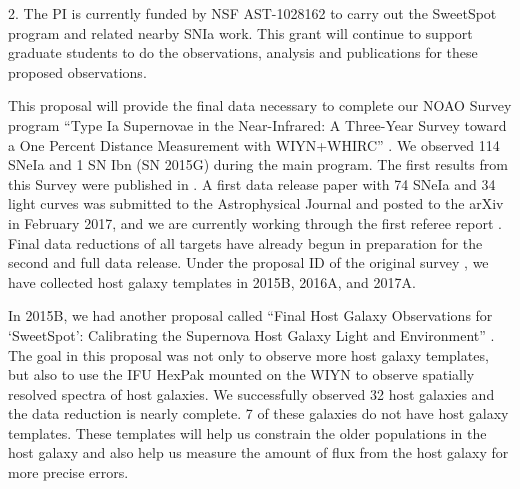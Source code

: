 \documentclass[11pt]{article}
\begin{document}
2. The PI is currently funded by NSF AST-1028162 to carry out the SweetSpot program and related nearby SNIa work.  This grant will continue to support graduate students to do the observations, analysis and publications for these proposed observations.

%
%
%
%
%


%

\thepast

This proposal will provide the final data necessary to complete our NOAO Survey 
program ``Type Ia Supernovae in the Near-Infrared: A Three-Year Survey toward a One Percent Distance Measurement with WIYN+WHIRC'' .
We observed 114 SNeIa and 1 SN Ibn (SN 2015G) during the main program.
The first results from this Survey were published in \cite{weyant14}.  
A first data release paper with 74 SNeIa and 34 light curves was submitted to the Astrophysical Journal and posted to the arXiv in February 2017, and we are currently working through the first referee report \cite{weyant17}.
Final data reductions of all targets have already begun in preparation for the second and full data release.
Under the proposal ID of the original survey  , we have collected host galaxy templates in 2015B, 2016A, and 2017A.

In 2015B, we had another proposal called  ``Final Host Galaxy Observations for `SweetSpot': Calibrating the Supernova Host Galaxy Light and Environment'' .
The goal in this proposal was not only to observe more host galaxy templates, but also to use the IFU HexPak mounted on the WIYN to observe spatially resolved spectra of host galaxies. 
We successfully observed 32 host galaxies and the data reduction is nearly complete. 
7 of these galaxies do not have host galaxy templates. 
These templates will help us constrain the older populations in the host galaxy and also help us measure the amount of flux from the host galaxy for more precise errors.
\end{document}
